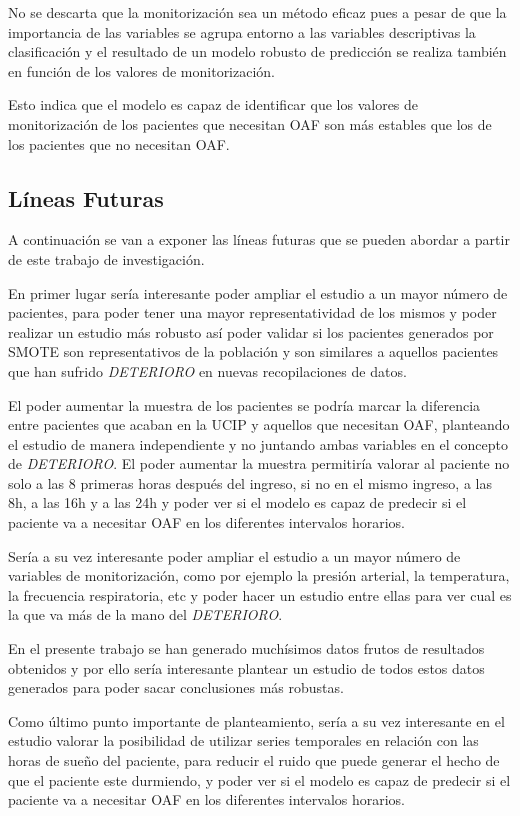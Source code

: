 No se descarta que la monitorización sea un método eficaz pues a pesar de que la importancia de las variables se agrupa entorno a las variables descriptivas la clasificación y el resultado de un modelo robusto de predicción se realiza también en función de los valores de monitorización.  

Esto indica que el modelo es capaz de identificar que los valores de monitorización de los pacientes que necesitan OAF son más estables que los de los pacientes que no necesitan OAF.



\subsection{Líneas Futuras}\label{sec:líneas-futuras}

A continuación se van a exponer las líneas futuras que se pueden abordar a partir de este trabajo de investigación.

En primer lugar sería interesante poder ampliar el estudio a un mayor número de pacientes, para poder tener una mayor representatividad de los mismos y poder realizar un estudio más robusto así poder validar si los pacientes generados por SMOTE son representativos de la población y son similares a aquellos pacientes que han sufrido \textit{DETERIORO} en nuevas recopilaciones de datos.

El poder aumentar la muestra de los pacientes se podría marcar la diferencia entre pacientes que acaban en la UCIP y aquellos que necesitan OAF, planteando el estudio de manera independiente y no juntando ambas variables en el concepto de \textit{DETERIORO}. El poder aumentar la muestra permitiría valorar al paciente no solo a las 8 primeras horas después del ingreso, si no en el mismo ingreso, a las 8h, a las 16h y a las 24h y poder ver si el modelo es capaz de predecir si el paciente va a necesitar OAF en los diferentes intervalos horarios.

Sería a su vez interesante poder ampliar el estudio a un mayor número de variables de monitorización, como por ejemplo la presión arterial, la temperatura, la frecuencia respiratoria, etc y poder hacer un estudio entre ellas para ver cual es la que va más de la mano del \textit{DETERIORO}.

En el presente trabajo se han generado muchísimos datos frutos de resultados obtenidos y por ello sería interesante plantear un estudio de todos estos datos generados para poder sacar conclusiones más robustas. 

Como último punto importante de planteamiento, sería a su vez interesante en el estudio valorar la posibilidad de utilizar series temporales en relación con las horas de sueño del paciente, para reducir el ruido que puede generar el hecho de que el paciente este durmiendo, y poder ver si el modelo es capaz de predecir si el paciente va a necesitar OAF en los diferentes intervalos horarios. 